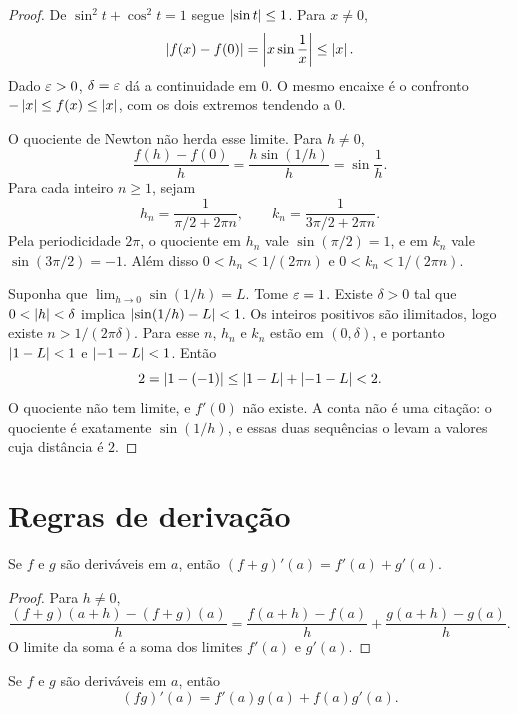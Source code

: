 \documentclass[11pt,a4paper]{article}
\begin{document}
\begin{proof}
De $\sin^2 t+\cos^2 t=1$ segue $\left\lvert \sin t \right\rvert\le 1$. Para $x\neq 0$,
\[
\left\lvert f(x)-f(0) \right\rvert=\left\lvert x\sin\frac{1}{x} \right\rvert\le \left\lvert x \right\rvert.
\]
Dado $\varepsilon>0$, $\delta=\varepsilon$ d\'a a continuidade em $0$. O mesmo encaixe \'e o confronto $- \left\lvert x \right\rvert\le f(x)\le \left\lvert x \right\rvert$, com os dois extremos tendendo a $0$.

O quociente de Newton n\~ao herda esse limite. Para $h\neq 0$,
\[
\frac{f(h)-f(0)}{h}=\frac{h\sin(1/h)}{h}=\sin\frac{1}{h}.
\]
Para cada inteiro $n\ge 1$, sejam
\[
h_n=\frac{1}{\pi/2+2\pi n}, \qquad k_n=\frac{1}{3\pi/2+2\pi n}.
\]
Pela periodicidade $2\pi$, o quociente em $h_n$ vale $\sin(\pi/2)=1$, e em $k_n$ vale $\sin(3\pi/2)=-1$. Al\'em disso $0<h_n<1/(2\pi n)$ e $0<k_n<1/(2\pi n)$.

Suponha que $\lim_{h\to 0}\sin(1/h)=L$. Tome $\varepsilon=1$. Existe $\delta>0$ tal que $0<\left\lvert h \right\rvert<\delta$ implica $\left\lvert \sin(1/h)-L \right\rvert<1$. Os inteiros positivos s\~ao ilimitados, logo existe $n>1/(2\pi\delta)$. Para esse $n$, $h_n$ e $k_n$ est\~ao em $(0,\delta)$, e portanto $\left\lvert 1-L \right\rvert<1$ e $\left\lvert -1-L \right\rvert<1$. Ent\~ao
\[
2=\left\lvert 1-(-1) \right\rvert\le \left\lvert 1-L \right\rvert+\left\lvert -1-L \right\rvert<2.
\]
O quociente n\~ao tem limite, e $f'(0)$ n\~ao existe. A conta n\~ao \'e uma cita\c{c}\~ao: o quociente \'e exatamente $\sin(1/h)$, e essas duas sequ\^encias o levam a valores cuja dist\^ancia \'e $2$.
\end{proof}

\section{Regras de deriva\c{c}\~ao}
\label{sec:regras}

\begin{teorema}[Soma]
\label{teo:soma-der}
Se $f$ e $g$ s\~ao deriv\'aveis em $a$, ent\~ao $(f+g)'(a)=f'(a)+g'(a)$.
\end{teorema}

\begin{proof}
Para $h\neq 0$,
\[
\frac{(f+g)(a+h)-(f+g)(a)}{h}
=\frac{f(a+h)-f(a)}{h}+\frac{g(a+h)-g(a)}{h}.
\]
O limite da soma \'e a soma dos limites $f'(a)$ e $g'(a)$.
\end{proof}

\begin{teorema}[Produto]
\label{teo:produto-der}
Se $f$ e $g$ s\~ao deriv\'aveis em $a$, ent\~ao
\[
(fg)'(a)=f'(a)g(a)+f(a)g'(a).
\]
\end{teorema}
\end{document}
